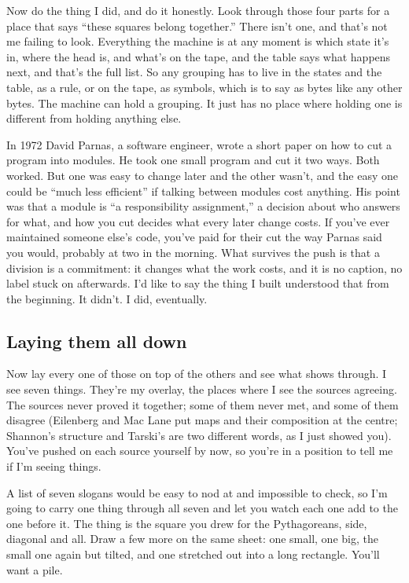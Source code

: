 \documentclass[11pt,twoside]{article}
\theoremstyle{thielethm}
\theoremstyle{thieledef}
\theoremstyle{thieledef}
\theoremstyle{thieledef}
\theoremstyle{thielethm}
\theoremstyle{thieleobs}
\theoremstyle{thielethm}
\begin{document}
Now do the thing I did, and do it honestly. Look through those four parts for a place that says ``these squares belong together.'' There isn't one, and that's not me failing to look. Everything the machine is at any moment is which state it's in, where the head is, and what's on the tape, and the table says what happens next, and that's the full list. So any grouping has to live in the states and the table, as a rule, or on the tape, as symbols, which is to say as bytes like any other bytes. The machine can hold a grouping. It just has no place where holding one is different from holding anything else.

In 1972 David Parnas, a software engineer, wrote a short paper on how to cut a program into modules. He took one small program and cut it two ways. Both worked. But one was easy to change later and the other wasn't, and the easy one could be ``much less efficient'' if talking between modules cost anything. His point was that a module is ``a responsibility assignment,'' a decision about who answers for what, and how you cut decides what every later change costs. If you've ever maintained someone else's code, you've paid for their cut the way Parnas said you would, probably at two in the morning. What survives the push is that a division is a commitment: it changes what the work costs, and it is no caption, no label stuck on afterwards. I'd like to say the thing I built understood that from the beginning. It didn't. I did, eventually.

\subsection{Laying them all down}

Now lay every one of those on top of the others and see what shows through. I see seven things. They're my overlay, the places where I see the sources agreeing. The sources never proved it together; some of them never met, and some of them disagree (Eilenberg and Mac Lane put maps and their composition at the centre; Shannon's structure and Tarski's are two different words, as I just showed you). You've pushed on each source yourself by now, so you're in a position to tell me if I'm seeing things.

A list of seven slogans would be easy to nod at and impossible to check, so I'm going to carry one thing through all seven and let you watch each one add to the one before it. The thing is the square you drew for the Pythagoreans, side, diagonal and all. Draw a few more on the same sheet: one small, one big, the small one again but tilted, and one stretched out into a long rectangle. You'll want a pile.
\end{document}
